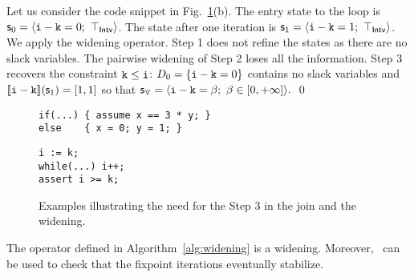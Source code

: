 \documentclass{llncs}
\begin{document}
\begin{example}
Let us consider the code snippet in Fig.~\ref{ex:joinwiden}(b).
The entry state to the loop is
\(
\mathsf{\mathsf{s}}_0  = \langle  \mathtt{i} - \mathtt{k} = 0;\  \top_{\mathsf{Intv}} \rangle \).
The state after one iteration is
\(\mathsf{\mathsf{s}}_1  = \langle  \mathtt{i} -\mathtt{k} = 1;\  \top_{\mathsf{Intv}} \rangle \).
We apply the widening operator. 
Step 1 does not refine the states as there are no slack variables.
The pairwise widening of Step 2 loses all the information.
Step 3 recovers the constraint $\mathtt{k} \leq \mathtt{i}$:
 $D_0 = \{ \mathtt{i} -\mathtt{k} = 0 \}$  contains no slack variables and 
$\llbracket \mathtt{\mathtt{i} -\mathtt{k} } \rrbracket(\mathsf{\mathsf{s}}_1) = [1, 1]$ so that 
\(
\mathsf{\mathsf{s}}_{\triangledown} = \langle  \mathtt{i} -\mathtt{k} = \beta_{};\ \beta_{} \in [0, +\infty]  \rangle.
\)
\qed
\end{example}


\begin{figure}[t]
\centering
  \begin{subfloat}
    \begin{minipage}{5cm}
\begin{verbatim}
if(...) { assume x == 3 * y; } 
else    { x = 0; y = 1; }
\end{verbatim}
    \end{minipage}
    \caption{}
  \end{subfloat}    
  \qquad 
  \begin{subfloat}
    \begin{minipage}{2.5cm}
\begin{verbatim}
i := k;
while(...) i++;
assert i >= k;
\end{verbatim}
    \end{minipage}
    \caption{}
  \end{subfloat}
\vspace{-0.2cm}
\caption{Examples illustrating the need for the Step 3 in the join and the widening.}
\label{ex:joinwiden}
\vspace{-0.2cm}
\end{figure}

\begin{theorem}
The operator defined in Algorithm~\ref{alg:widening} is a widening. Moreover, \lessS\ can be used to check  that the fixpoint iterations eventually stabilize.
\end{theorem}
\end{document}
